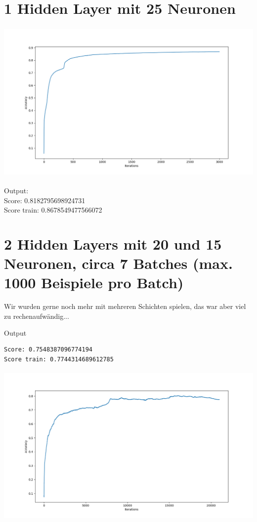 \section*{1 Hidden Layer mit 25 Neuronen}

\includegraphics[height=8cm]{./25inner.png}

Output: \\
Score: 0.8182795698924731 \\
Score train: 0.8678549477566072 \\

\section*{2 Hidden Layers mit 20 und 15 Neuronen, circa 7 Batches (max. 1000 Beispiele pro Batch)}
Wir wurden gerne noch mehr mit mehreren Schichten spielen, das war aber viel zu rechenaufwändig...

Output
\begin{lstlisting}
Score: 0.7548387096774194
Score train: 0.7744314689612785

\end{lstlisting}

\includegraphics[height=8cm]{./2_hidden_layers_20_15_with_7_batches.png}

